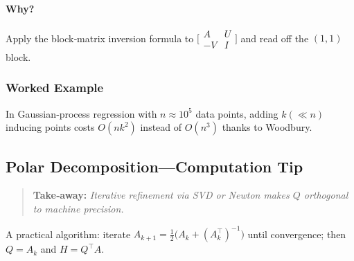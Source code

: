 \paragraph{Why?}
Apply the block‑matrix inversion formula to
$\bigl[\!\begin{smallmatrix}A & U \\[2pt]-V & I\end{smallmatrix}\!\bigr]$ and read off the $(1,1)$ block.

\subsubsection*{Worked Example}
In Gaussian‑process regression with $n\!\approx\!10^5$ data points, adding $k\!(\!\ll n)$ inducing points costs $O(nk^2)$ instead of $O(n^3)$ thanks to Woodbury.

\subsection{Polar Decomposition—Computation Tip}
\begin{quote}
\textbf{Take‑away:} \emph{Iterative refinement via SVD or Newton makes $Q$ orthogonal to machine precision.}
\end{quote}

A practical algorithm: iterate $A_{k+1}=\tfrac12\bigl(A_k + (A_k^\top)^{-1}\bigr)$ until convergence; then $Q=A_k$ and $H=Q^\top A$.


